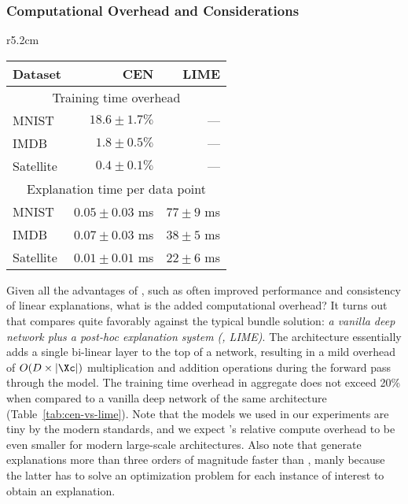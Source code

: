 \documentclass[twoside,11pt]{article}
\begin{document}
\subsubsection{Computational Overhead and Considerations}
\label{sec:computational-considerations}


\begin{wraptable}{r}{5.2cm}
\vspace{-1.5ex}
\caption{Compute time overhead.}
\vspace{-1ex}
\centering
\scriptsize
\def\arraystretch{1.2}
\begin{tabular}[t]{@{}l|r|r@{}}
    \toprule
    \textbf{Dataset} & \textbf{CEN} & \textbf{LIME} \\
    \midrule
    \multicolumn{3}{c}{Training time overhead} \\
    \midrule
    MNIST & $18.6 \pm 1.7 \%$ & --- \\
    IMDB & $1.8 \pm 0.5 \%$ & --- \\
    Satellite & $0.4 \pm 0.1 \%$ & --- \\
    \midrule
    \multicolumn{3}{c}{Explanation time per data point} \\
    \midrule
    MNIST & $0.05 \pm 0.03$ ms  & $77 \pm 9$ ms \\
    IMDB & $0.07 \pm 0.03$ ms  & $38 \pm 5$ ms \\
    Satellite & $0.01 \pm 0.01$ ms & $22 \pm 6$ ms \\
    \bottomrule
\end{tabular}
\label{tab:cen-vs-lime}
\end{wraptable}
 
Given all the advantages of \CEN, such as often improved performance and consistency of linear explanations, what is the added computational overhead?
It turns out that \CEN compares quite favorably against the typical bundle solution: \emph{a vanilla deep network plus a post-hoc explanation system (\eg, LIME)}.
The \CEN architecture essentially adds a single bi-linear layer to the top of a network, resulting in a mild overhead of $O(D \times |\Xc|)$ multiplication and addition operations during the forward pass through the model.
The training time overhead in aggregate does not exceed 20\% when compared to a vanilla deep network of the same architecture (Table~\ref{tab:cen-vs-lime}).
Note that the models we used in our experiments are tiny by the modern standards, and we expect \CEN's relative compute overhead to be even smaller for modern large-scale architectures.
Also note that \CENs generate explanations more than three orders of magnitude faster than \LIME, manly because the latter has to solve an optimization problem for each instance of interest to obtain an explanation.
\end{document}
